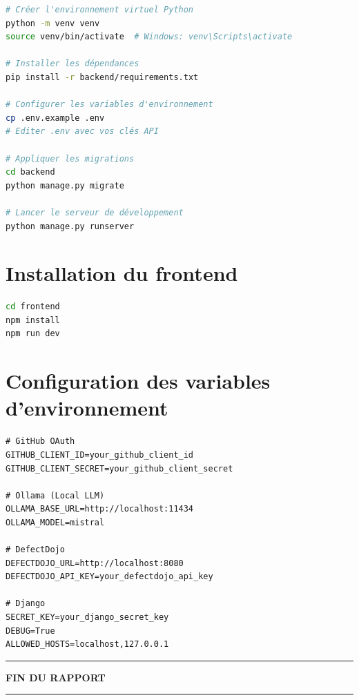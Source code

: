 \documentclass[12pt, a4paper, oneside]{report}
\begin{document}
\begin{lstlisting}[language=bash, caption=Installation du backend Django]
# Créer l'environnement virtuel Python
python -m venv venv
source venv/bin/activate  # Windows: venv\Scripts\activate

# Installer les dépendances
pip install -r backend/requirements.txt

# Configurer les variables d'environnement
cp .env.example .env
# Editer .env avec vos clés API

# Appliquer les migrations
cd backend
python manage.py migrate

# Lancer le serveur de développement
python manage.py runserver
\end{lstlisting}

\section{Installation du frontend}

\begin{lstlisting}[language=bash, caption=Installation du frontend React]
cd frontend
npm install
npm run dev
\end{lstlisting}

\section{Configuration des variables d'environnement}

\begin{lstlisting}[caption=Fichier .env principal]
# GitHub OAuth
GITHUB_CLIENT_ID=your_github_client_id
GITHUB_CLIENT_SECRET=your_github_client_secret

# Ollama (Local LLM)
OLLAMA_BASE_URL=http://localhost:11434
OLLAMA_MODEL=mistral

# DefectDojo
DEFECTDOJO_URL=http://localhost:8080
DEFECTDOJO_API_KEY=your_defectdojo_api_key

# Django
SECRET_KEY=your_django_secret_key
DEBUG=True
ALLOWED_HOSTS=localhost,127.0.0.1
\end{lstlisting}

\begin{center}
    \vspace{3cm}
    \textcolor{primaryblue}{\rule{4cm}{1.5pt} \quad \textbf{FIN DU RAPPORT} \quad \rule{4cm}{1.5pt}}
\end{center}
\end{document}
